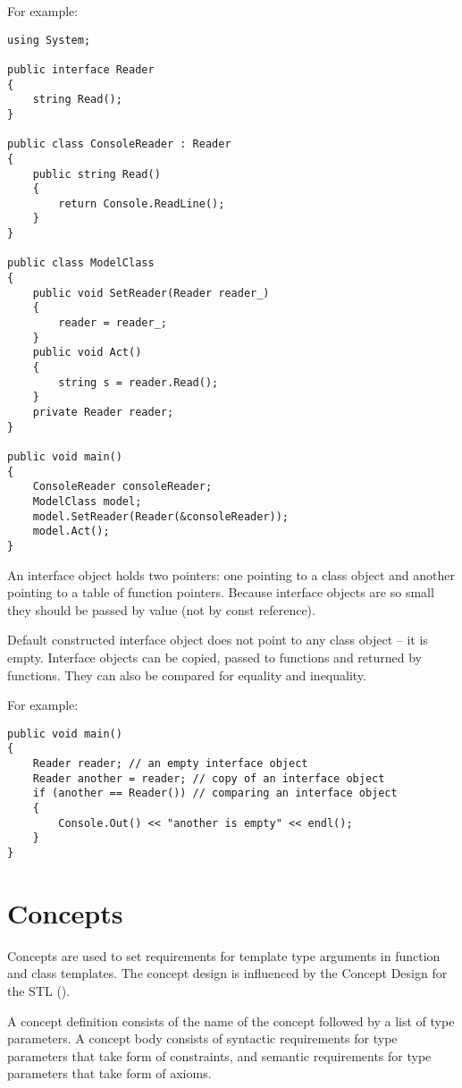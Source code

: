 \documentclass[a4paper,oneside,11pt]{article}
\begin{document}
For example:

\begin{lstlisting}[frame=trBL]
using System;

public interface Reader
{
    string Read();
}

public class ConsoleReader : Reader
{
    public string Read()
    {
        return Console.ReadLine();
    }
}

public class ModelClass
{
    public void SetReader(Reader reader_)
    {
        reader = reader_;
    }
    public void Act()
    {
        string s = reader.Read();
    }
    private Reader reader;
}

public void main()
{
    ConsoleReader consoleReader;
    ModelClass model;
    model.SetReader(Reader(&consoleReader));
    model.Act();
}
\end{lstlisting}

An interface object holds two pointers: one pointing to a class object and another pointing to a table of function pointers.
Because interface objects are so small they should be passed by value (not by const reference).

Default constructed interface object does not point to any class object -- it is empty.
Interface objects can be copied, passed to functions and returned by functions.
They can also be compared for equality and inequality.

For example:

\begin{lstlisting}[frame=trBL]
public void main()
{
    Reader reader; // an empty interface object
    Reader another = reader; // copy of an interface object
    if (another == Reader()) // comparing an interface object
    {
        Console.Out() << "another is empty" << endl();
    }
}
\end{lstlisting}

\section{Concepts}

Concepts are used to set requirements for template type arguments in function and class templates.
The concept design is influenced by the Concept Design for the STL (\cite{STLCONCEPTS}).

A concept definition consists of the name of the concept followed by a list of type parameters.
A concept body consists of syntactic requirements for type parameters that take form of constraints,
and semantic requirements for type parameters that take form of axioms.
\end{document}
